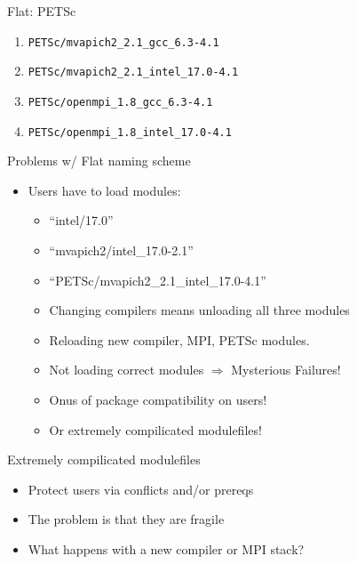 \documentclass[dvipsnames,aspectratio=169]{beamer}
\begin{document}
\begin{frame}{Flat: PETSc }
  \begin{enumerate}
  \item \texttt{PETSc/mvapich2\_2.1\_gcc\_6.3-4.1}
  \item \texttt{PETSc/mvapich2\_2.1\_intel\_17.0-4.1}
  \item \texttt{PETSc/openmpi\_1.8\_gcc\_6.3-4.1}
  \item \texttt{PETSc/openmpi\_1.8\_intel\_17.0-4.1}
  \end{enumerate}
\end{frame}

\begin{frame}{Problems w/ Flat naming scheme}
  \begin{itemize}
    \item Users have to load modules:
      \begin{itemize}
        \item ``intel/17.0''
        \item ``mvapich2/intel\_17.0-2.1''
        \item ``PETSc/mvapich2\_2.1\_intel\_17.0-4.1''
        \item Changing compilers means unloading all three modules
        \item Reloading new compiler, MPI, PETSc modules.
        \item Not loading correct modules $\Rightarrow$ Mysterious Failures!
        \item Onus of package compatibility on users!
        \item Or extremely compilicated modulefiles!
      \end{itemize}
  \end{itemize}
\end{frame}

\begin{frame}{Extremely compilicated modulefiles}
  \begin{itemize}
    \item Protect users via conflicts and/or prereqs
    \item The problem is that they are fragile
    \item What happens with a new compiler or MPI stack?
  \end{itemize}
\end{frame}
\end{document}
